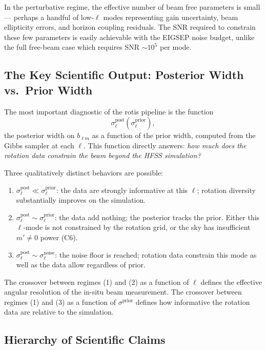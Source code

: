 \documentclass{aastex631}
\newcommand{\blm}{b_{\ell m}}
\theoremstyle{plain}
\theoremstyle{remark}
\begin{document}
In the perturbative regime, the effective number of beam free
parameters is small --- perhaps a handful of low-$\ell$ modes
representing gain uncertainty, beam ellipticity errors, and horizon
coupling residuals.
The SNR required to constrain these few parameters is easily
achievable with the EIGSEP noise budget, unlike the full free-beam
case which requires SNR $\sim 10^5$ per mode.

\subsection{The Key Scientific Output: Posterior Width vs.\ Prior Width}

The most important diagnostic of the rotis pipeline is the function
\begin{equation}
  \sigma^\mathrm{post}_\ell(\sigma^\mathrm{prior}_\ell),
\end{equation}
the posterior width on $\blm$ as a function of the prior width,
computed from the Gibbs sampler at each $\ell$.
This function directly answers: \emph{how much does the rotation
data constrain the beam beyond the HFSS simulation?}

Three qualitatively distinct behaviors are possible:
\begin{enumerate}
  \item $\sigma^\mathrm{post}_\ell \ll \sigma^\mathrm{prior}_\ell$:
    the data are strongly informative at this $\ell$; rotation
    diversity substantially improves on the simulation.
  \item $\sigma^\mathrm{post}_\ell \sim \sigma^\mathrm{prior}_\ell$:
    the data add nothing; the posterior tracks the prior.
    Either this $\ell$-mode is not constrained by the rotation
    grid, or the sky has insufficient $m' \neq 0$ power (C6).
  \item $\sigma^\mathrm{post}_\ell \sim \sigma^\mathrm{noise}_\ell$:
    the noise floor is reached; rotation data constrain this mode
    as well as the data allow regardless of prior.
\end{enumerate}
The crossover between regimes (1) and (2) as a function of $\ell$
defines the effective angular resolution of the in-situ beam
measurement.
The crossover between regimes (1) and (3) as a function of
$\sigma^\mathrm{prior}$ defines how informative the rotation data
are relative to the simulation.

\subsection{Hierarchy of Scientific Claims}
\end{document}
